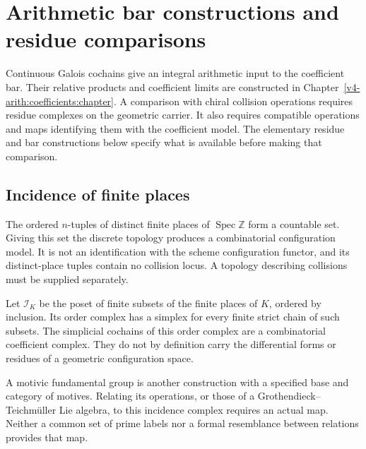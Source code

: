 \chapter{Arithmetic bar constructions and residue comparisons}
\label{v4-arith:arakelov-bar}

Continuous Galois cochains give an integral arithmetic input to the
coefficient bar. Their relative products and coefficient limits are
constructed in Chapter~\ref{v4-arith:coefficients:chapter}.
A comparison with chiral collision operations requires residue complexes
on the geometric carrier. It also requires compatible operations and
maps identifying them with the coefficient model.
The elementary residue and bar constructions below specify what is
available before making that comparison.

\section{Incidence of finite places}
\label{v4-arith:bar:configuration-space}

\begin{observation}
\label{v4-arith:obs:config-discrete}
The ordered \(n\)-tuples of distinct finite places of
\(\operatorname{Spec}\mathbb Z\) form a countable set. Giving this
set the discrete topology produces a combinatorial configuration
model. It is not an identification with the scheme configuration
functor, and its distinct-place tuples contain no collision locus.
A topology describing collisions must be supplied separately.
\end{observation}

\begin{definition}
\label{v4-arith:def:arith-config}
Let \(\mathcal I_K\) be the poset of finite subsets of the finite
places of \(K\), ordered by inclusion. Its order complex has a simplex
for every finite strict chain of such subsets. The simplicial
cochains of this order complex are a combinatorial coefficient
complex. They do not by definition carry the differential forms or
residues of a geometric configuration space.
\end{definition}

A motivic fundamental group is another construction with a specified
base and category of motives. Relating its operations, or those of a
Grothendieck--Teichm\"uller Lie algebra, to this incidence complex
requires an actual map. Neither a common set of prime labels nor a
formal resemblance between relations provides that map.

